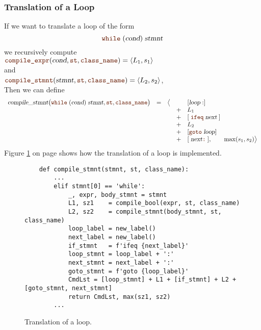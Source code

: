 \subsubsection{Translation of a Loop}
If we want to translate a  loop of the form 
\[ \mytt{while}\;(\textsl{cond})\;\textsl{stmnt} \]
we recursively compute
\\[0.2cm]
\hspace*{1.3cm}
$\mytt{compile\_expr}(\textsl{cond}, \mytt{st}, \mytt{class\_name}) = \pair(L_1, s_1)$
\\[0.2cm]
and
\\[0.2cm]
\hspace*{1.3cm}
$\mytt{compile\_stmnt}(\textsl{stmnt}, \mytt{st}, \mytt{class\_name}) = \pair(L_2, s_2)$,
\\[0.2cm]
Then we can define
\[
   \begin{array}[t]{lcccl}
     \textsl{compile\_stmnt}\bigl(\mytt{while}\; (\textsl{cond})\;\textsl{stmnt}, \mytt{st}, \mytt{class\_name}\bigr)
     & = & \bigl\langle & & [ \textsl{loop}:]  \\
   &&& + & L_1 \\
   &&& + & [\;\mytt{ifeq}\;\textsl{next}\;] \\
   &&& + & L_2 \\
   &&& + & [\mytt{goto}\;\textsl{loop}] \\
   &&& + & [\;\textsl{next}\mytt{:}\;], \qquad \max(s_1, s_2) \bigr\rangle        
\end{array}
\]
Figure \ref{fig:Compiler.ipynb:compile:while} on page \pageref{fig:Compiler.ipynb:compile:while} shows how the
translation of a loop is implemented.

\begin{figure}[!ht]
\centering
\begin{verbatim}
    def compile_stmnt(stmnt, st, class_name):
        ...
        elif stmnt[0] == 'while':
            _, expr, body_stmnt = stmnt
            L1, sz1    = compile_bool(expr, st, class_name)
            L2, sz2    = compile_stmnt(body_stmnt, st, class_name)
            loop_label = new_label()
            next_label = new_label()
            if_stmnt   = f'ifeq {next_label}'
            loop_stmnt = loop_label + ':'        
            next_stmnt = next_label + ':'
            goto_stmnt = f'goto {loop_label}'
            CmdLst = [loop_stmnt] + L1 + [if_stmnt] + L2 + [goto_stmnt, next_stmnt]
            return CmdLst, max(sz1, sz2)
        ...       
\end{verbatim}
\vspace*{-0.3cm}
\caption{Translation of a loop.}
\label{fig:Compiler.ipynb:compile:while}
\end{figure}

